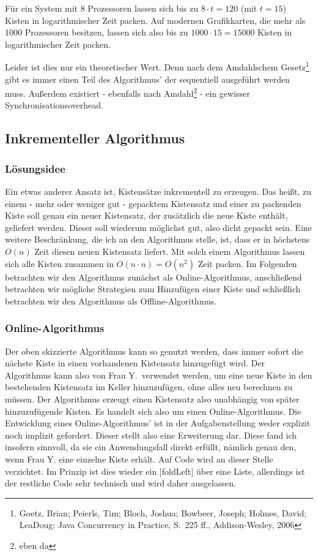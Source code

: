  Für ein System mit 8 Prozessoren lassen sich bis zu $8 \cdot t = 120$ (mit $t=15$) Kisten in logarithmischer Zeit packen.
 Auf modernen Grafikkarten, die mehr als 1000 Prozessoren besitzen, lassen sich also bis zu $1000 \cdot 15=15000$ Kisten in logarithmischer Zeit packen.

 Leider ist dies nur ein theoretischer Wert. Denn nach dem Amdahlschem Gesetz\footnote{Goetz, Brian; Peierls, Tim; Bloch, Joshua; Bowbeer, Joseph; Holmes, David; LeaDoug: Java Concurrency in Practice, S.\ 225 ff., Addison-Wesley, 2006}
  gibt es immer einen Teil des Algorithmus' der sequentiell ausgeführt werden muss.
 Außerdem existiert - ebenfalls nach Amdahl\footnote{eben da} - ein gewisser Synchronisationsoverhead.
\subsection{Inkrementeller Algorithmus}
\label{ink}
\subsubsection{Lösungsidee}
 Ein etwas anderer Ansatz ist, Kistensätze inkrementell zu erzeugen.
 Das heißt, zu einem - mehr oder weniger gut - gepacktem Kistensatz und einer zu packenden Kiste soll genau ein neuer Kistensatz,
  der zusätzlich die neue Kiste enthält, geliefert werden.
 Dieser soll wiederum möglichst gut, also dicht gepackt sein.
 Eine weitere Beschränkung, die ich an den Algorithmus stelle, ist, dass er in höchstens $O(n)$ Zeit diesen neuen Kistensatz liefert.
 Mit solch einem Algorithmus lassen sich alle Kisten zusammen in $O(n \cdot n)=O(n^2)$ Zeit packen.
 Im Folgenden betrachten wir den Algorithmus zunächst als Online-Algorithmus, anschließend betrachten wir mögliche Strategien zum Hinzufügen einer Kiste
  und schließlich betrachten wir den Algorithmus als Offline-Algorithmus.
\subsubsection{Online-Algorithmus}
 Der oben skizzierte Algorithmus kann so genutzt werden, dass immer sofort die nächste Kiste in einen vorhandenen Kistensatz hinzugefügt wird.
 Der Algorithmus kann also von Frau Y.\ verwendet werden,
  um eine neue Kiste in den bestehenden Kistensatz im Keller hinzuzufügen, ohne alles neu berechnen zu müssen.
 Der Algorithmus erzeugt einen Kistensatz also unabhängig von später hinzuzufügende Kisten.
 Es handelt sich also um einen Online-Algorithmus. Die Entwicklung eines Online-Algorithmus' ist in der Aufgabenstellung weder explizit noch implizit gefordert.
 Dieser stellt also eine Erweiterung dar.
 Diese fand ich insofern sinnvoll, da sie ein Anwendungsfall direkt erfüllt, nämlich genau den, wenn Frau Y. eine einzelne Kiste erhält.
 Auf Code wird an dieser Stelle verzichtet. Im Prinzip ist dies wieder ein |foldLeft| über eine Liste, allerdings ist der restliche Code sehr technisch
  und wird daher ausgelassen.
\lstset{basicstyle=\ttfamily}
